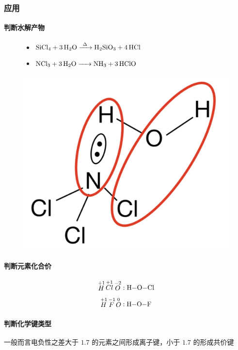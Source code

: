 \documentclass[a4paper]{article}
\begin{document}
	\subsubsection{应用}
	\paragraph{判断水解产物}
	
	\hfill
	\begin{figure}[h]
	\begin{minipage}{0.48\linewidth}
	\begin{itemize}
		\item $\ce{SiCl4 + 3H2O ->[\Delta] H2SiO3 + 4HCl}$
		\item $\ce{NCl3 + 3H2O -> NH3 + 3HClO}$
	\end{itemize}
	\end{minipage}
	\begin{minipage}{0.48\linewidth}
	\centering
	\includegraphics[scale=0.2]{res/NCl.pdf}
	\end{minipage}
	\end{figure}
	\paragraph{判断元素化合价}
	$$\mathop{H}^{+1}\mathop{Cl}^{+1}\mathop{O}^{-2}:\ce{H-O-Cl}$$
	$$\mathop{H}^{+1}\mathop{F}^{-1}\mathop{O}^{0}:\ce{H-O-F}$$
	\paragraph{判断化学键类型}
	一般而言电负性之差大于 $1.7$ 的元素之间形成离子键，小于 $1.7$ 的形成共价键
	
\end{document}
